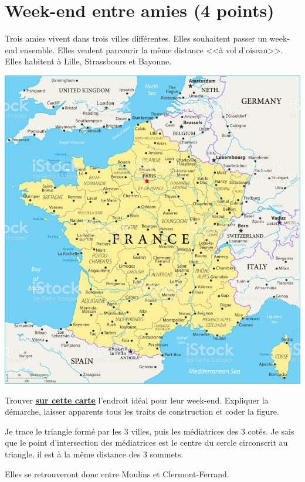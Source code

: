 \section{Week-end entre amies (4 points)}

Trois amies vivent dans trois villes différentes. Elles souhaitent passer un week-end ensemble. Elles veulent parcourir la même distance <<à vol d'oiseau>>. Elles habitent à Lille, Strassbours et Bayonne.

\begin{center}
	\includegraphics[scale=1.55]{img/france}
\end{center}

\begin{questions}
	\question[4] Trouver \textbf{\underline{sur cette carte}} l'endroit idéal pour leur week-end. Expliquer la démarche, laisser apparents tous les traits de construction et coder la figure.
	
	\begin{solution}
		Je trace le triangle formé par les 3 villes, puis les médiatrices des 3 cotés.
		Je sais que le point d'intersection des médiatrices est le centre du cercle circonscrit au triangle, il est à la même distance des 3 sommets. 
		
		Elles se retrouveront donc entre Moulins et Clermont-Ferrand.
	\end{solution}
\end{questions}

